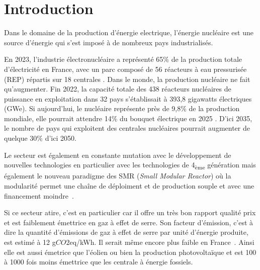 \chapter{Introduction}

Dans le domaine de la production d'énergie electrique, l'énergie nucléaire est une source d'énergie qui s'est imposé à de nombreux pays industrialisés.

En 2023, l'industrie électronucléaire a représenté 65\% de la production totale d'électricité en France, avec un parc composé de 56 réacteurs à eau pressurisée (REP) répartis sur 18 centrales \cite{rte2023}. Dans le monde, la production nucléaire ne fait qu'augmenter. Fin 2022, la capacité totale des 438 réacteurs nucléaires de puissance en exploitation dans 32 pays s’établissait à 393,8 gigawatts électriques (GWe). Si aujourd'hui, le nucléaire représente près de 9,8\% de la production mondiale, elle pourrait attendre 14\% du bouquet électrique en 2025 \cite{aiea2023}. D'ici 2035, le nombre de pays qui exploitent des centrales nucléaires pourrait augmenter de quelque 30\% d'ici 2050.

Le secteur est également en constante mutation avec le développement de nouvelles technologies en particulier avec les technologies de 4\textsubscript{ème} génération mais également le nouveau paradigme des SMR (\textit{Small Modular Reactor}) où la modularité permet une chaîne de déploiment et de production souple et avec une financement moindre~\cite{academie2022}.

Si ce secteur atire, c'est en particulier car il offre un très bon rapport qualité prix et est faiblement émettrice en gaz à effet de serre. Son facteur d'émission, c'est à dire la quantité d'émissions de gaz à effet de serre par unité d'énergie produite, est estimé à 12 g$CO2$eq/kWh. Il serait même encore plus faible en France~\cite{schlomer_technology-specific_nodate}. Ainsi elle est aussi émetrice que l'éolien ou bien la production photovoltaïque et est 100 à 1000 fois moins émettrice que les centrale à énergie fossiels.

